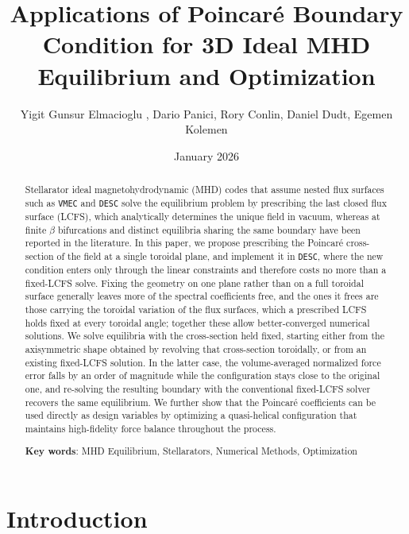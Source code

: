 \documentclass{jpp}
\title{Applications of Poincaré Boundary Condition for 3D Ideal MHD Equilibrium and Optimization}
\author{Yigit Gunsur Elmacioglu\aff{1}
  \corresp{\email{yigit.elma@princeton.edu}}, Dario Panici\aff{1}, Rory Conlin\aff{2}, Daniel Dudt\aff{3},
Egemen Kolemen\aff{1}\corresp{\email{ekolemen@princeton.edu}}}
\affiliation{
    \aff{1}Princeton University, Princeton, New Jersey 08544, USA
    \aff{2}Rory Affiliation
    \aff{3}Thea Energy, USA
}
\date{January 2026}
\begin{document}
\maketitle


\begin{abstract}
Stellarator ideal magnetohydrodynamic (MHD) codes that assume nested flux surfaces such as \texttt{VMEC} and \texttt{DESC} solve the equilibrium problem by prescribing the last closed flux surface (LCFS), which analytically determines the unique field in vacuum, whereas at finite $\beta$ bifurcations and distinct equilibria sharing the same boundary have been reported in the literature. In this paper, we propose prescribing the Poincaré cross-section of the field at a single toroidal plane, and implement it in \texttt{DESC}, where the new condition enters only through the linear constraints and therefore costs no more than a fixed-LCFS solve. Fixing the geometry on one plane rather than on a full toroidal surface generally leaves more of the spectral coefficients free, and the ones it frees are those carrying the toroidal variation of the flux surfaces, which a prescribed LCFS holds fixed at every toroidal angle; together these allow better-converged numerical solutions. We solve equilibria with the cross-section held fixed, starting either from the axisymmetric shape obtained by revolving that cross-section toroidally, or from an existing fixed-LCFS solution. In the latter case, the volume-averaged normalized force error falls by an order of magnitude while the configuration stays close to the original one, and re-solving the resulting boundary with the conventional fixed-LCFS solver recovers the same equilibrium. We further show that the Poincaré coefficients can be used directly as design variables by optimizing a quasi-helical configuration that maintains high-fidelity force balance throughout the process.

\textbf{Key words}: MHD Equilibrium, Stellarators, Numerical Methods, Optimization

\end{abstract}

\maketitle

\section{Introduction}
\end{document}
